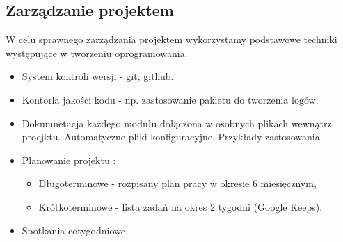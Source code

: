 \subsection{Zarządzanie projektem}
W celu sprawnego zarządzania projektem wykorzystamy podstawowe techniki występujące w tworzeniu oprogramowania.
\begin{itemize}
\item System kontroli wersji - git, github.
\item Kontorla jakości kodu - np. zastosowanie pakietu do tworzenia logów.
\item Dokumnetacja każdego modułu dołączona w osobnych plikach wewnątrz proejktu. Automatyczne pliki konfiguracyjne. Przykłady zastosowania.
\item Planowanie projektu :
\begin{itemize}
\item Długoterminowe - rozpisany plan pracy w okresie 6 miesięcznym,
\item Krótkoterminowe - lista zadań na okres 2 tygodni (Google Keeps).
\end{itemize}
\item Spotkania cotygodniowe.
\end{itemize}

